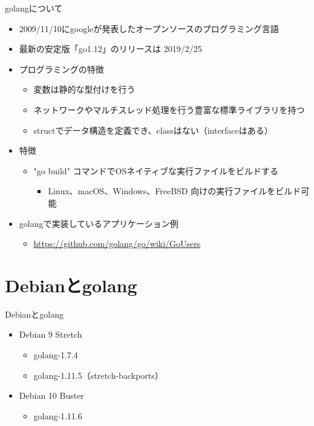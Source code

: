 \begin{frame}[containsverbatim]{golangについて}
  \begin{itemize}
  \item 2009/11/10にgoogleが発表したオープンソースのプログラミング言語
  \item 最新の安定版「go1.12」のリリースは 2019/2/25
  \item プログラミングの特徴
    \begin{itemize}
    \item 変数は静的な型付けを行う
    \item ネットワークやマルチスレッド処理を行う豊富な標準ライブラリを持つ
    \item structでデータ構造を定義でき、classはない（interfaceはある）
    \end{itemize}
  \item 特徴
    \begin{itemize}
    \item "go build" コマンドでOSネイティブな実行ファイルをビルドする
      \begin{itemize}
      \item Linux、macOS、Windows、FreeBSD 向けの実行ファイルをビルド可能
      \end{itemize}
    \end{itemize}
  \item golangで実装しているアプリケーション例
    \begin{itemize}
    \item \url{https://github.com/golang/go/wiki/GoUsers}
    \end{itemize}
  \end{itemize}
\end{frame}


\section{Debianとgolang}

\begin{frame}[containsverbatim]{Debianとgolang}
  \begin{itemize}
  \item Debian 9 Stretch
    \begin{itemize}
    \item golang-1.7.4
    \item golang-1.11.5（stretch-backports）
    \end{itemize}
  \item Debian 10 Buster
    \begin{itemize}
    \item golang-1.11.6
    \end{itemize}
  \end{itemize}
\end{frame}


